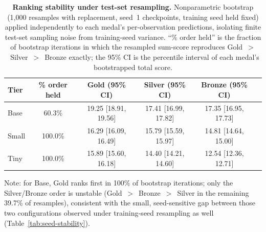 \begin{table}[t]
\centering
\caption{\textbf{Ranking stability under test-set resampling.} Nonparametric
bootstrap (1{,}000 resamples with replacement, seed~1 checkpoints, training
seed held fixed) applied independently to each medal's per-observation
predictions, isolating finite test-set sampling noise from training-seed
variance. ``\% order held'' is the fraction of bootstrap iterations in which
the resampled sum-score reproduces Gold~$>$~Silver~$>$~Bronze exactly; the
95\% CI is the percentile interval of each medal's bootstrapped total score.}
\label{tab:bootstrap-stability}
\begin{tabular}{lccccc}
\toprule
Tier & \% order held & Gold (95\% CI) & Silver (95\% CI) & Bronze (95\% CI) \\
\midrule
Base  & 60.3\% & 19.25 [18.91, 19.56] & 17.41 [16.99, 17.82] & 17.35 [16.95, 17.73] \\
Small & 100.0\% & 16.29 [16.09, 16.49] & 15.79 [15.59, 15.97] & 14.81 [14.64, 15.00] \\
Tiny  & 100.0\% & 15.89 [15.60, 16.18] & 14.40 [14.21, 14.60] & 12.54 [12.36, 12.71] \\
\bottomrule
\end{tabular}

\vspace{2pt}
\footnotesize
Note: for Base, Gold ranks first in 100\% of bootstrap iterations; only the
Silver/Bronze order is unstable (Gold~$>$~Bronze~$>$~Silver in the remaining
39.7\% of resamples), consistent with the small, seed-sensitive gap between
those two configurations observed under training-seed resampling as well
(Table~\ref{tab:seed-stability}).
\end{table}


